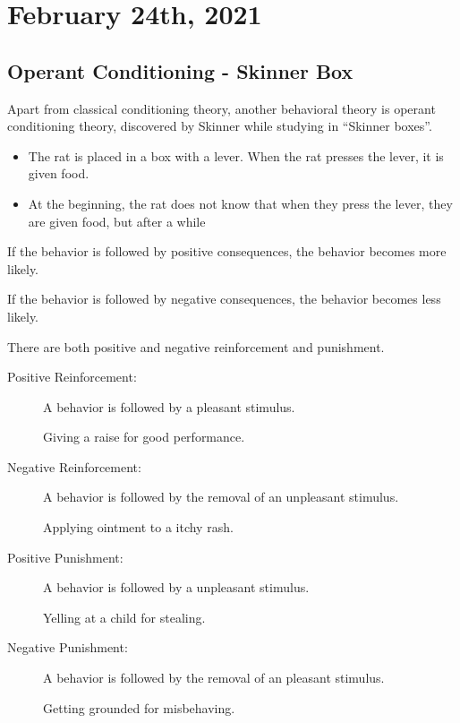 \documentclass[../main/main.tex]{subfiles}
\begin{document}
\section{February 24th, 2021}
\subsection{Operant Conditioning - Skinner Box}
Apart from classical conditioning theory, another behavioral theory is operant conditioning theory, discovered by Skinner while studying in ``Skinner boxes''.
\begin{example}
\begin{itemize}
  \item The rat is placed in a box with a lever. When the rat presses the lever, it is given food.
  \item At the beginning, the rat does not know that when they press the lever, they are given food, but after a while
\end{itemize}
\end{example}
\begin{definition}
If the behavior is followed by positive consequences, the behavior becomes more likely.
\end{definition}
\begin{definition}
If the behavior is followed by negative consequences, the behavior becomes less likely.
\end{definition}

\begin{remark}
There are both positive and negative reinforcement and punishment.
\end{remark}
\begin{description}
  \item[Positive Reinforcement:]  A behavior is followed by a pleasant stimulus.
        \begin{example}
Giving a raise for good performance.
        \end{example}
  \item[Negative Reinforcement:]  A behavior is followed by the removal of an unpleasant stimulus.
        \begin{example}
          Applying ointment to a itchy rash.
        \end{example}
  \item[Positive Punishment:]  A behavior is followed by a unpleasant stimulus.
        \begin{example}
          Yelling at a child for stealing.
        \end{example}
  \item[Negative Punishment:]  A behavior is followed by the removal of an pleasant stimulus.
        \begin{example}
          Getting grounded for misbehaving.
        \end{example}
\end{description}
\end{document}
